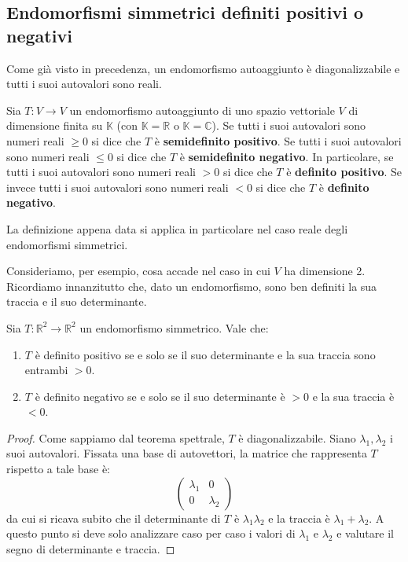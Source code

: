 
\subsection{Endomorfismi simmetrici definiti positivi o negativi}
Come gi\`a visto in precedenza, un endomorfismo autoaggiunto \`e diagonalizzabile e
tutti i suoi autovalori sono reali.

\begin{defn}
	Sia $T : V \to V$ un endomorfismo autoaggiunto di uno spazio vettoriale $V$ di
	dimensione finita su $\mathbb{K}$ (con $\mathbb{K} = \mathbb{R}$ o
	$\mathbb{K} = \mathbb{C}$). Se tutti i suoi autovalori sono numeri reali $\geq 0$
	si dice che $T$ \`e \textbf{semidefinito positivo}. Se tutti i suoi autovalori
	sono numeri reali $\leq 0$ si dice che $T$ \`e \textbf{semidefinito negativo}.
	In particolare, se tutti i suoi autovalori sono numeri reali $> 0$ si dice che
	$T$ \`e \textbf{definito positivo}. Se invece tutti i suoi autovalori sono numeri
	reali $< 0$ si dice che $T$ \`e \textbf{definito negativo}.
\end{defn}

La definizione appena data si applica in particolare nel caso reale degli
endomorfismi simmetrici.

Consideriamo, per esempio, cosa accade nel caso in cui $V$ ha dimensione 2.
Ricordiamo innanzitutto che, dato un endomorfismo, sono ben definiti la sua traccia
e il suo determinante.

\begin{proposition}
	Sia $T : \mathbb{R}^2 \to \mathbb{R}^2$ un endomorfismo simmetrico. Vale che:
	\begin{enumerate}
		\item
		      $T$ \`e definito positivo se e solo se il suo determinante e la sua
		      traccia sono entrambi $> 0$.
		\item
		      $T$ \`e definito negativo se e solo se il suo determinante \`e $> 0$ e
		      la sua traccia \`e $< 0$.
	\end{enumerate}

	\begin{proof}
		Come sappiamo dal teorema spettrale, $T$ \`e diagonalizzabile. Siano
		$\lambda_1, \lambda_2$ i suoi autovalori. Fissata una base di autovettori,
		la matrice che rappresenta $T$ rispetto a tale base \`e:
		\begin{equation*}
			\begin{pmatrix}
				\lambda_1 & 0         \\
				0         & \lambda_2
			\end{pmatrix}
		\end{equation*}
		da cui si ricava subito che il determinante di $T$ \`e $\lambda_1 \lambda_2$
		e la traccia \`e $\lambda_1 + \lambda_2$. A questo punto si deve solo
		analizzare caso per caso i valori di $\lambda_1$ e $\lambda_2$ e valutare
		il segno di determinante e traccia.
	\end{proof}
\end{proposition}